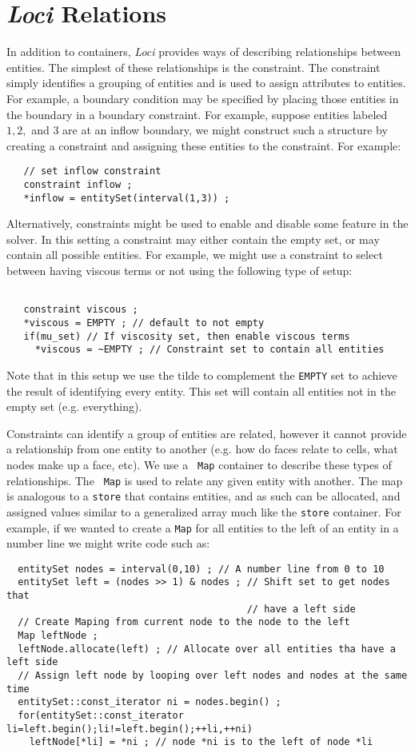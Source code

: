 \documentclass[10pt,epsf]{book}
\begin{document}
\section{{\it Loci} Relations}

In addition to containers, {\it Loci} provides ways of describing
relationships between entities.  The simplest of these relationships
is the constraint.  The constraint simply identifies a grouping of
entities and is used to assign attributes to entities.  For example, a
boundary condition may be specified by placing those entities in the
boundary in a boundary constraint.  For example, suppose entities
labeled $1,2,$ and $3$ are at an inflow boundary, we might construct
such a structure by creating a constraint and assigning these entities
to the constraint.  For example:
\begin{verbatim}
   // set inflow constraint
   constraint inflow ;
   *inflow = entitySet(interval(1,3)) ;
\end{verbatim}
Alternatively, constraints might be used to enable and disable some
feature in the solver.  In this setting a constraint may either
contain the empty set, or may contain all possible entities.  For
example, we might use a constraint to select between having viscous
terms or not using the following type of setup:
\begin{verbatim}

   constraint viscous ;
   *viscous = EMPTY ; // default to not empty 
   if(mu_set) // If viscosity set, then enable viscous terms
     *viscous = ~EMPTY ; // Constraint set to contain all entities
\end{verbatim}
Note that in this setup we use the tilde to complement the {\tt EMPTY} set
to achieve the result of identifying every entity.  This set will contain
all entities not in the empty set (e.g. everything).  

Constraints can identify a group of entities are related, however it
cannot provide a relationship from one entity to another (e.g. how do
faces relate to cells, what nodes make up a face, etc).  We use a {\tt
  Map} container to describe these types of relationships.  The {\tt
  Map} is used to relate any given entity with another.  The map is
analogous to a {\tt store} that contains entities, and as such can be
allocated, and assigned values similar to a generalized array much
like the {\tt store} container.  For example, if we wanted to create a {\tt Map} for all entities to the left of an entity in a number line we might write code such as:
\begin{verbatim}
  entitySet nodes = interval(0,10) ; // A number line from 0 to 10
  entitySet left = (nodes >> 1) & nodes ; // Shift set to get nodes that
                                          // have a left side
  // Create Maping from current node to the node to the left
  Map leftNode ;
  leftNode.allocate(left) ; // Allocate over all entities tha have a left side
  // Assign left node by looping over left nodes and nodes at the same time
  entitySet::const_iterator ni = nodes.begin() ;
  for(entitySet::const_iterator li=left.begin();li!=left.begin();++li,++ni)
    leftNode[*li] = *ni ; // node *ni is to the left of node *li
\end{verbatim}
\end{document}
